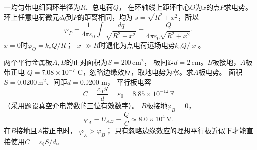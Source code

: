 \problemtext 一均匀带电细圆环半径为$R$、总电荷$Q$，
在环轴线上距环中心$O$为$x$的点$P$求电势。
\workings
环上任意电荷微元$dq$到$P$的距离相同，均为
$s=\sqrt{R^2+x^2}$，所以
\[
\varphi_P=\frac1{4\pi\varepsilon_0}
\int\frac{dq}{\sqrt{R^2+x^2}}
=\boxed{\frac{Q}{4\pi\varepsilon_0\sqrt{R^2+x^2}}}.
\]
\crosscheck $x=0$时$\varphi_O=k_eQ/R$；
$|x|\gg R$时退化为点电荷远场电势$k_eQ/|x|$。

\problemtext 两个平行金属板$A,B$的正对面积为$S=200\,\mathrm{cm^2}$，
板间距$d=2\,\mathrm{cm}$。$B$板接地，$A$板带正电
$Q=7.08\times10^{-7}$ C，忽略边缘效应，取地电势为零。求$A$板电势。
\workings
面积$S=0.0200\,\mathrm{m^2}$、间距$d=0.0200$ m，
平行板电容
\[
C=\frac{\varepsilon_0 S}{d}
=\varepsilon_0
=8.85\times10^{-12}\,\mathrm F
\]
（采用题设真空介电常数的三位有效数字）。
$B$板接地$\varphi_B=0$，
\[
\boxed{\varphi_A=U_{AB}=\frac{Q}{C}
\approx8.0\times10^4\,\mathrm V}.
\]
\crosscheck 在$B$接地且$A$带正电时，
$\varphi_A>\varphi_B$；
只有忽略边缘效应的理想平行板近似下才能直接使用$C=\varepsilon_0S/d$。
